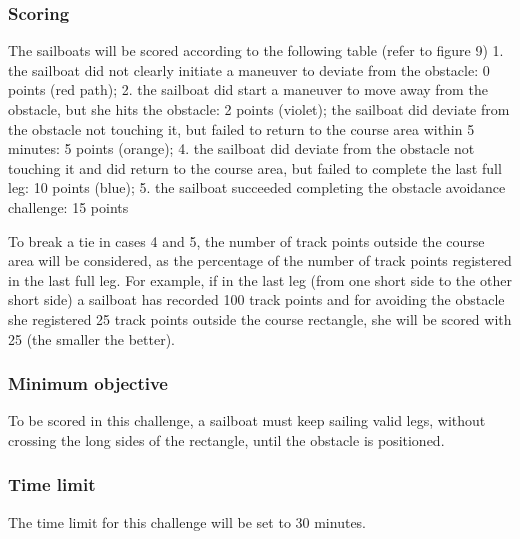 \documentclass[12pt]{article}
\begin{document}
\subsubsection{Scoring}
The sailboats will be scored according to the following table (refer to figure
9)
1. the sailboat did not clearly initiate a maneuver to deviate from the
obstacle: 0 points (red
path);
2. the sailboat did start a maneuver to move away from the obstacle, but she
hits the obstacle: 2
points (violet);
the sailboat did deviate from the obstacle not touching it, but failed to return
to the course
area within 5 minutes: 5 points (orange);
4. the sailboat did deviate from the obstacle not touching it and did return to
the course area,
but failed to complete the last full leg: 10 points (blue);
5. the sailboat succeeded completing the obstacle avoidance challenge: 15 points

To break a tie in cases 4 and 5, the number of track points outside the course
area will be
considered, as the percentage of the number of track points registered in the
last full leg. For
example, if in the last leg (from one short side to the other short side) a
sailboat has recorded
100 track points and for avoiding the obstacle she registered 25 track points
outside the
course rectangle, she will be scored with 25 (the smaller the better).

\subsubsection{Minimum objective}
To be scored in this challenge, a sailboat must keep sailing valid legs, without
crossing the long
sides of the rectangle, until the obstacle is positioned.

\subsubsection{Time limit}
The time limit for this challenge will be set to 30 minutes.
\end{document}
